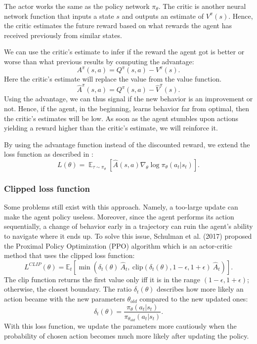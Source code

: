 \documentclass[12pt,A4]{report}
\theoremstyle{definition}
\begin{document}
The actor works the same as the policy network $\pi_\theta$. The critic is another neural network function that inputs a state $s$ and outputs an estimate of $V^\pi(s)$. Hence, the critic estimates the future reward based on what rewards the agent has received previously from similar states.


We can use the critic's estimate to infer if the reward the agent got is better or worse than what previous results by computing the advantage:
\[A^\pi(s,a) = Q^\pi(s, a) - V^\pi(s).\]
Here the critic's estimate will replace the value from the value function.
\[\hat{A}^\pi(s,a) = Q^\pi(s, a) - \hat{V}^\pi(s).\]
Using the advantage, we can thus signal if the new behavior is an improvement or not. Hence, if the agent, in the beginning, learns behavior far from optimal, then the critic's estimates will be low. As soon as the agent stumbles upon actions yielding a reward higher than the critic's estimate, we will reinforce it. 

By using the advantage function instead of the discounted reward, we extend the loss function as described in \citet{OpenAI}:
\[ L(\theta) = \mathop{\mathbb{E}}_{\tau \sim \pi_\theta} [\hat{A}(s,a) \nabla_\theta \log \pi_\theta (a_t|s_t) ]. \]

\subsubsection{Clipped loss function}
Some problems still exist with this approach. Namely, a too-large update can make the agent policy useless. Moreover, since the agent performs its action sequentially, a change of behavior early in a trajectory can ruin the agent's ability to navigate where it ends up. To solve this issue, Schulman et al. (2017) proposed the Proximal Policy Optimization (PPO) algorithm which is an actor-critic method that uses the clipped loss function:
\[L^{CLIP}(\theta) = \mathbb{E}_t \left [ \min(\delta_t(\theta) \ \hat{A}_t,\ 
\text{clip}(\delta_t(\theta), 1 - \epsilon, 1 + \epsilon) \ \hat{A}_t) \right ]. \]
The clip function returns the first value only iff it is in the range $(1-\epsilon, 1+\epsilon)$; otherwise, the closest boundary. The ratio $\delta_t(\theta)$ describes how more likely an action became with the new parameters $\theta_{old}$ compared to the new updated ones:
\[ \delta_t(\theta) = \frac{\pi_\theta(a_t| s_t)}{\pi_{\theta_{old}}(a_t|s_t)}. \]
With this loss function, we update the parameters more cautiously when the probability of chosen action becomes much more likely after updating the policy.
\end{document}
